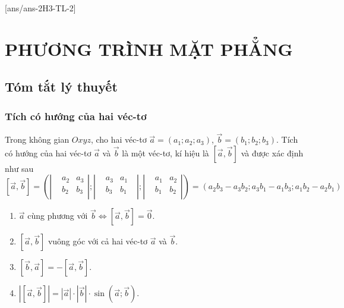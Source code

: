 [ans/ans-2H3-TL-2]
\setcounter{dang}{0}
\setcounter{vd}{0}
\section{PHƯƠNG TRÌNH MẶT PHẲNG}
\subsection{Tóm tắt lý thuyết}
\begin{tomtat}
	\subsubsection{Tích có hướng của hai véc-tơ }
	\begin{dn}
		Trong không gian $Oxyz$, cho hai véc-tơ $\vec{a}=(a_1;a_2;a_3 )$, $\vec{b}=(b_1;b_2;b_3 )$. Tích có hướng của hai véc-tơ $\vec{a}$ và $\vec{b}$ là một véc-tơ, kí hiệu là $\left[ \vec{a},\vec{b} \right]$ và được xác định như sau
		$$\left[ \overrightarrow{a},\overrightarrow{b} \right]=\left( \left| \begin{aligned}
		& a_2&a_3 \\
		& b_2&b_3 \\
		\end{aligned} \right|;\left| \begin{aligned}
		& a_3&a_1\text{ } \\
		& b_3&b_1 \\
		\end{aligned} \right|;\left| \begin{aligned}
		& a_1&a_2 \\
		& b_1&b_2 \\
		\end{aligned} \right| \right)=\left( a_2b_3-a_3b_2;a_3b_1-a_1b_3;a_1b_2-a_2b_1 \right)$$
		
	\end{dn}
	\begin{tc}
		\begin{enumerate}
			\item $\vec{a}$ cùng phương với $\vec{b}$$\Leftrightarrow \left[ \vec{a},\vec{b} \right]=\vec{0}$.
			\item $\left[ \vec{a},\vec{b} \right]$ vuông góc với cả hai véc-tơ $\vec{a}$ và $\vec{b}$.
			\item $\left[ \vec{b},\vec{a} \right]=-\left[ \vec{a},\vec{b} \right]$.
			\item $\left| \left[ \vec{a},\vec{b} \right] \right|=\left| \vec{a} \right|\cdot \left| \vec{b} \right|\cdot \sin (\vec{a};\vec{b} )$.
		\end{enumerate}
	\end{tc}

\end{tomtat}
